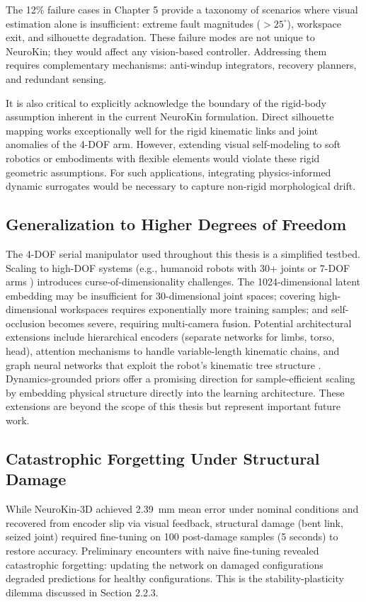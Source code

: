 \documentclass[12pt,a4paper,oneside]{report}
\begin{document}
The 12\% failure cases in Chapter 5 provide a taxonomy of scenarios where visual estimation alone is insufficient: extreme fault magnitudes ($>25^\circ$), workspace exit, and silhouette degradation. These failure modes are not unique to NeuroKin; they would affect any vision-based controller. Addressing them requires complementary mechanisms: anti-windup integrators, recovery planners, and redundant sensing.

It is also critical to explicitly acknowledge the boundary of the rigid-body assumption inherent in the current NeuroKin formulation. Direct silhouette mapping works exceptionally well for the rigid kinematic links and joint anomalies of the 4-DOF arm. However, extending visual self-modeling to soft robotics or embodiments with flexible elements would violate these rigid geometric assumptions. For such applications, integrating physics-informed dynamic surrogates would be necessary to capture non-rigid morphological drift.

\subsection{Generalization to Higher Degrees of Freedom}
The 4-DOF serial manipulator used throughout this thesis is a simplified testbed. Scaling to high-DOF systems (e.g., humanoid robots with 30+ joints or 7-DOF arms \cite{schulze2024high}) introduces curse-of-dimensionality challenges. The 1024-dimensional latent embedding may be insufficient for 30-dimensional joint spaces; covering high-dimensional workspaces requires exponentially more training samples; and self-occlusion becomes severe, requiring multi-camera fusion. Potential architectural extensions include hierarchical encoders (separate networks for limbs, torso, head), attention mechanisms to handle variable-length kinematic chains, and graph neural networks that exploit the robot's kinematic tree structure \cite{patel2024getzero}. Dynamics-grounded priors \cite{peng2026eagle} offer a promising direction for sample-efficient scaling by embedding physical structure directly into the learning architecture. These extensions are beyond the scope of this thesis but represent important future work.

\subsection{Catastrophic Forgetting Under Structural Damage}
While NeuroKin-3D achieved 2.39~mm mean error under nominal conditions and recovered from encoder slip via visual feedback, structural damage (bent link, seized joint) required fine-tuning on 100 post-damage samples (5 seconds) to restore accuracy. Preliminary encounters with naive fine-tuning revealed catastrophic forgetting: updating the network on damaged configurations degraded predictions for healthy configurations. This is the stability-plasticity dilemma discussed in Section 2.2.3.
\end{document}

